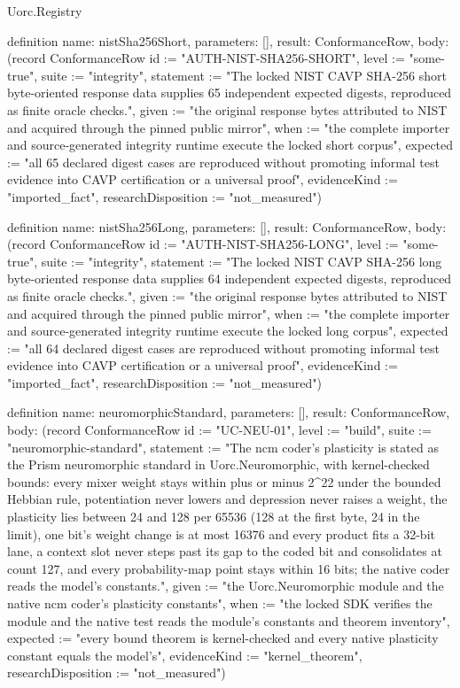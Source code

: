 \begin{lexlean}{Uorc.Registry}
\begin{semanticmodule}
definition{
  name: nistSha256Short,
  parameters: [],
  result: ConformanceRow,
  body: (record ConformanceRow {id := "AUTH-NIST-SHA256-SHORT", level := "some-true", suite := "integrity", statement := "The locked NIST CAVP SHA-256 short byte-oriented response data supplies 65 independent expected digests, reproduced as finite oracle checks.", given := "the original response bytes attributed to NIST and acquired through the pinned public mirror", when := "the complete importer and source-generated integrity runtime execute the locked short corpus", expected := "all 65 declared digest cases are reproduced without promoting informal test evidence into CAVP certification or a universal proof", evidenceKind := "imported_fact", researchDisposition := "not_measured"})
}

definition{
  name: nistSha256Long,
  parameters: [],
  result: ConformanceRow,
  body: (record ConformanceRow {id := "AUTH-NIST-SHA256-LONG", level := "some-true", suite := "integrity", statement := "The locked NIST CAVP SHA-256 long byte-oriented response data supplies 64 independent expected digests, reproduced as finite oracle checks.", given := "the original response bytes attributed to NIST and acquired through the pinned public mirror", when := "the complete importer and source-generated integrity runtime execute the locked long corpus", expected := "all 64 declared digest cases are reproduced without promoting informal test evidence into CAVP certification or a universal proof", evidenceKind := "imported_fact", researchDisposition := "not_measured"})
}

definition{
  name: neuromorphicStandard,
  parameters: [],
  result: ConformanceRow,
  body: (record ConformanceRow {id := "UC-NEU-01", level := "build", suite := "neuromorphic-standard", statement := "The ncm coder's plasticity is stated as the Prism neuromorphic standard in Uorc.Neuromorphic, with kernel-checked bounds: every mixer weight stays within plus or minus 2^22 under the bounded Hebbian rule, potentiation never lowers and depression never raises a weight, the plasticity lies between 24 and 128 per 65536 (128 at the first byte, 24 in the limit), one bit's weight change is at most 16376 and every product fits a 32-bit lane, a context slot never steps past its gap to the coded bit and consolidates at count 127, and every probability-map point stays within 16 bits; the native coder reads the model's constants.", given := "the Uorc.Neuromorphic module and the native ncm coder's plasticity constants", when := "the locked SDK verifies the module and the native test reads the module's constants and theorem inventory", expected := "every bound theorem is kernel-checked and every native plasticity constant equals the model's", evidenceKind := "kernel_theorem", researchDisposition := "not_measured"})
}


\end{semanticmodule}
\end{lexlean}
